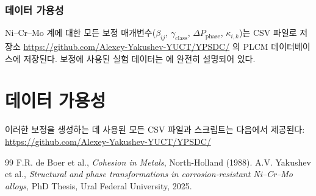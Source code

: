 \documentclass[12pt,a4paper]{article}
\begin{document}
	\subsubsection{데이터 가용성}
	Ni–Cr–Mo 계에 대한 모든 보정 매개변수($\beta_{ij}$, $\gamma_{\text{class}}$, $\Delta P_{\text{phase}}$, $\kappa_{i,k}$)는 CSV 파일로 저장소 \url{https://github.com/Alexey-Yakushev-YUCT/YPSDC/} 의 PLCM 데이터베이스에 저장된다. 보정에 사용된 실험 데이터는 \cite{dis2025} 에 완전히 설명되어 있다.
	
	
	\section{데이터 가용성}
	이러한 보정을 생성하는 데 사용된 모든 CSV 파일과 스크립트는 다음에서 제공된다:
	\url{https://github.com/Alexey-Yakushev-YUCT/YPSDC/}
	
	\begin{thebibliography}{99}
		 F.R. de Boer et al., \emph{Cohesion in Metals}, North-Holland (1988).
		 A.V. Yakushev et al., \emph{Structural and phase transformations in corrosion‑resistant Ni–Cr–Mo alloys}, PhD Thesis, Ural Federal University, 2025.
	\end{thebibliography}
	
\end{document}
